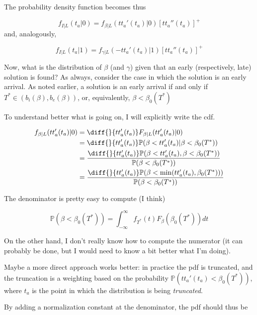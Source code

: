 \documentclass{article}
\begin{document}
The probability density function becomes thus

\begin{equation}
  \label{eq:pdf_early}
  f_{I | L}(t_a | 0) = f_{\beta | L}(tt_a'(t_a) | 0)[tt_a''(t_a)]^+
\end{equation}
and, analogously,

\begin{equation}
  \label{eq:pdf_late}
  f_{I | L}(t_a | 1) = f_{\gamma | L}(-tt_a'(t_a) | 1)[tt_a''(t_a)]^+
\end{equation}

Now, what is the distribution of \(\beta\) (and \(\gamma\)) given that an early (respectively, late) solution is found?
As always, consider the case in which the solution is an early arrival.
As noted earlier, a solution is an early arrival if and only if \(T^* \in (b_i(\beta), b_e(\beta))\), or, equivalently, \(\beta < \beta_0(T^*)\)

To understand better what is going on, I will explicitly write the cdf.

\begin{align*}
  f_{\beta | L}(tt_a'(t_a) | 0) & = \diff{}{tt_a'(t_a)}F_{\beta | L}(tt_a'(t_a) | 0) \\
  & = \diff{}{tt_a'(t_a)}\mathbb{P}(\beta < tt_a'(t_a) | \beta < \beta_0(T^*)) \\
  & = \frac{\diff{}{tt_a'(t_a)}\mathbb{P}(\beta < tt_a'(t_a), \beta < \beta_0(T^*))}{\mathbb{P}(\beta < \beta_0(T^*))} \\
  & = \frac{\diff{}{tt_a'(t_a)}\mathbb{P}(\beta < \min(tt_a'(t_a), \beta_0(T^*)))}{\mathbb{P}(\beta < \beta_0(T^*))}
\end{align*}

The denominator is pretty easy to compute (I think)

\begin{equation*}
  \mathbb{P}(\beta < \beta_0(T^*)) = \int_{-\infty}^\infty f_{T^*}(t) F_\beta(\beta_0(T^*)) dt
\end{equation*}

On the other hand, I don't really know how to compute the numerator (it can probably be done, but I would need to know a bit better what I'm doing).

Maybe a more direct approach works better:
in practice the pdf is truncated, and the truncation is a weighting based on the probability \(\mathbb{P}(tt_a'(t_a) < \beta_0(T^*))\), where \(t_a\) is the point in which the distribution is being \textit{truncated}.

By adding a normalization constant at the denominator, the pdf should thus be
\end{document}
